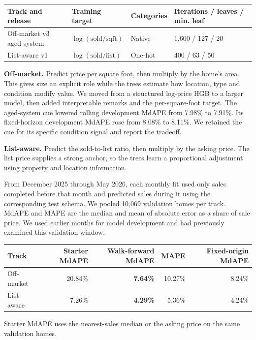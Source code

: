 \documentclass[11pt]{article}
\newcommand{\reportsection}[1]{\vspace{6pt}{\large\bfseries\color{navy} #1}\par\vspace{1pt}}
\begin{document}
\begin{center}
\small
\begin{tabular}{@{}llll@{}}
\toprule
Track and release & Training target & Categories & Iterations / leaves / min. leaf \\
\midrule
Off-market v3 aged-system & $\log(\mathrm{sold}/\mathrm{sqft})$ & Native & 1,600 / 127 / 20 \\
List-aware v1 & $\log(\mathrm{sold}/\mathrm{list})$ & One-hot & 400 / 63 / 50 \\
\bottomrule
\end{tabular}
\end{center}

\textbf{Off-market.} Predict price per square foot, then multiply by the home's area. This gives size an explicit role while the trees estimate how location, type and condition modify value. We moved from a structured log-price HGB to a larger model, then added interpretable remarks and the per-square-foot target. The aged-system cue lowered rolling development MdAPE from 7.98\% to 7.91\%. Its fixed-horizon development MdAPE rose from 8.08\% to 8.11\%. We retained the cue for its specific condition signal and report the tradeoff.

\textbf{List-aware.} Predict the sold-to-list ratio, then multiply by the asking price. The list price supplies a strong anchor, so the trees learn a proportional adjustment using property and location information.

\newpage
\reportsection{Validation and results}
From December 2025 through May 2026, each monthly fit used only sales completed before that month and predicted sales during it using the corresponding test schema. We pooled 10,069 validation homes per track. MdAPE and MAPE are the median and mean of absolute error as a share of sale price. We used earlier months for model development and had previously examined this validation window.

\begin{center}
\small
\begin{tabular}{@{}lrrrr@{}}
\toprule
Track & Starter MdAPE & Walk-forward MdAPE & MAPE & Fixed-origin MdAPE \\
\midrule
Off-market & 20.84\% & \textbf{7.64\%} & 10.27\% & 8.24\% \\
List-aware & 7.26\% & \textbf{4.29\%} & 5.36\% & 4.24\% \\
\bottomrule
\end{tabular}
\end{center}
Starter MdAPE uses the nearest-sales median or the asking price on the same validation homes.
\end{document}
